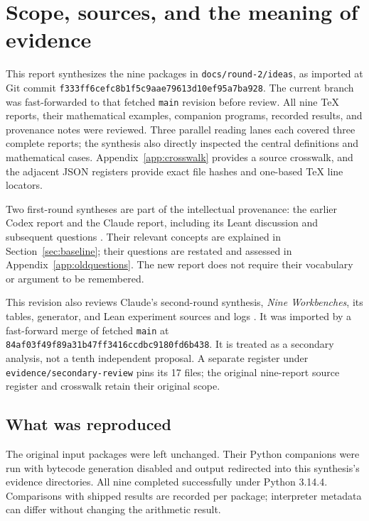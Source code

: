 \documentclass[11pt,letterpaper]{article}
\newcommand{\code}[1]{\nolinkurl{#1}}
\begin{document}
\clearpage
\tableofcontents
\clearpage

\section{Scope, sources, and the meaning of evidence}\label{sec:evidence}
This report synthesizes the nine packages in \code{docs/round-2/ideas}, as imported
at Git commit \code{f333ff6cefc8b1f5c9aae79613d10ef95a7ba928}. The current branch
was fast-forwarded to that fetched \texttt{main} revision before review. All nine
TeX reports, their mathematical examples, companion programs, recorded results,
and provenance notes were reviewed. Three parallel reading lanes each covered
three complete reports; the synthesis also directly inspected the central
definitions and mathematical cases. Appendix~\ref{app:crosswalk} provides a
source crosswalk, and the adjacent JSON registers provide exact file hashes and
one-based TeX line locators.

Two first-round syntheses are part of the intellectual provenance: the earlier
Codex report and the Claude report, including its Leant discussion and subsequent
questions \cite{round1,claude}. Their relevant concepts are explained in
Section~\ref{sec:baseline}; their questions are restated and assessed in
Appendix~\ref{app:oldquestions}. The new report does not require their vocabulary
or argument to be remembered.

This revision also reviews Claude's second-round synthesis, \emph{Nine
Workbenches}, its tables, generator, and Lean experiment sources and logs
\cite{secondary}. It was imported by a fast-forward merge of fetched
\texttt{main} at \code{84af03f49f89a31b47ff3416ccdbc9180fd6b438}.
It is treated as a secondary analysis, not a tenth independent proposal. A
separate register under \code{evidence/secondary-review} pins its 17 files;
the original nine-report source register and crosswalk retain their original scope.

\subsection{What was reproduced}
The original input packages were left unchanged. Their Python companions were
run with bytecode generation disabled and output redirected into this synthesis's
evidence directories. All nine completed successfully under Python 3.14.4.
Comparisons with shipped results are recorded per package; interpreter metadata
can differ without changing the arithmetic result.
\end{document}

